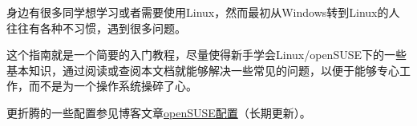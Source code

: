 身边有很多同学想学习或者需要使用Linux，然而最初从Windows转到Linux的人往往有各种不习惯，遇到很多问题。

这个指南就是一个简要的入门教程，尽量使得新手学会Linux/openSUSE下的一些基本知识，通过阅读或查阅本文档就能够解决一些常见的问题，以便于能够专心工作，而不是为一个操作系统操碎了心。

更折腾的一些配置参见博客文章\href{http://peijun.me/opensuse-configuration.html}{openSUSE配置}（长期更新）。
